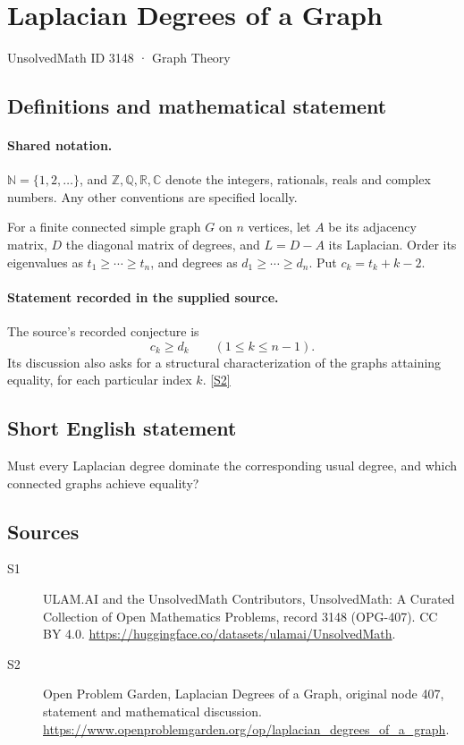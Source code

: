 \documentclass[11pt]{article}
\newcommand{\sref}[2]{\hyperlink{source:#1:#2}{[S#2]}}
\begin{document}
\setcounter{section}{3147}
\section{Laplacian Degrees of a Graph}\label{3148}
{\small\sffamily UnsolvedMath ID 3148 · Graph Theory}
\subsection{Definitions and mathematical statement}

\paragraph{Shared notation.}$\mathbb N=\{1,2,\ldots\}$, and $\mathbb Z,\mathbb Q,\mathbb R,\mathbb C$ denote the integers, rationals, reals and complex numbers. Any other conventions are specified locally.


For a finite connected simple graph $G$ on $n$ vertices, let $A$ be its adjacency matrix, $D$ the diagonal matrix of degrees, and $L=D-A$ its Laplacian. Order its eigenvalues as $t_1\ge\cdots\ge t_n$, and degrees as $d_1\ge\cdots\ge d_n$. Put $c_k=t_k+k-2$.
\paragraph{Statement recorded in the supplied source.}
The source's recorded conjecture is \[c_k\ge d_k\qquad(1\le k\le n-1).\] Its discussion also asks for a structural characterization of the graphs attaining equality, for each particular index $k$. \sref{3148}{2}
\subsection{Short English statement}
Must every Laplacian degree dominate the corresponding usual degree, and which connected graphs achieve equality?
\subsection{Sources}
\begin{description}
\item[\hypertarget{source:3148:1}{S1}] ULAM.AI and the UnsolvedMath Contributors, UnsolvedMath: A Curated Collection of Open Mathematics Problems, record 3148 (OPG-407). CC BY 4.0. \url{https://huggingface.co/datasets/ulamai/UnsolvedMath}.
\item[\hypertarget{source:3148:2}{S2}] Open Problem Garden, Laplacian Degrees of a Graph, original node 407, statement and mathematical discussion. \url{https://www.openproblemgarden.org/op/laplacian_degrees_of_a_graph}.
\end{description}
\label{end:3148}
\end{document}
